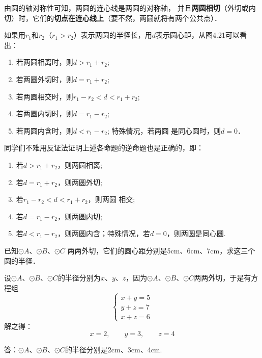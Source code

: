 由圆的轴对称性可知，两圆的连心线是两圆的对称轴，
并且\textbf{两圆相切}（外切或内切）时，它们的\textbf{切点在连心线上}（要不然，两圆就将有两个公共点）．



如果用$r_1$和$r_2$（$r_1>r_2$）表示两圆的半径长，用$d$表示圆心距，从图4.21可以看出：
\begin{enumerate}
\item 若两圆相离时，则$d>r_1+r_2$;
\item 若两圆外切时，则$d=r_1+r_2$;
\item 若两圆相交时，则$r_1-r_2<d<r_1+r_2$;
\item 若两圆内切时，则$d=r_1-r_2$;
\item 若两圆内含时，则$d<r_1-r_2$; 特殊情况，若两圆
是同心圆时，则$d=0$．
\end{enumerate}

同学们不难用反证法证明上述各命题的逆命题也是正确的，即：
\begin{enumerate}
  \item 若$d>r_1+r_2$，则两圆相离;
\item 若$d=r_1+r_2$，则两圆外切;
\item 若$r_1-r_2<d<r_1+r_2$，则两圆
相交;
\item  若$d=r_1-r_2$，则两圆内切;
\item 若$d<r_1-r_2$，则两圆内含；特殊情况，若$d=0$，则两圆是同心圆.
\end{enumerate}

\begin{example}
已知$\odot A$、$\odot B$、$\odot C$
  两两外切，它们的圆心距分别是5cm、6cm、7cm，求这三个圆的半径．
\end{example}

\begin{figure}[htp]
  \centering
{}
  \caption{}
\end{figure}


\begin{solution}
设$\odot A$、$\odot B$、$\odot C$的半径分别为$x$、$y$、$z$，因为$\odot A$、$\odot B$、$\odot C$两两外切，于是有方程组
\[\begin{cases}
  x+y=5\\
  y+z=7\\
  x+z=6
\end{cases}\]
解之得：
\[x=2,\qquad y=3,\qquad z=4\]

答：$\odot A$、$\odot B$、$\odot C$的半径分别是2cm、3cm、4cm.
\end{solution}


